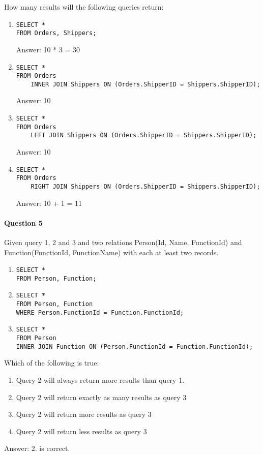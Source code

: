 \documentclass[10pt,a4paper]{report}
\begin{document}
How many results will the following queries return:
\begin{enumerate}
\item 
\begin{verbatim}
SELECT * 
FROM Orders, Shippers;
\end{verbatim}
Answer: 10 * 3 = 30 
\item 
\begin{verbatim}
SELECT * 
FROM Orders
    INNER JOIN Shippers ON (Orders.ShipperID = Shippers.ShipperID);
\end{verbatim}
Answer: 10 
\item
\begin{verbatim} 
SELECT * 
FROM Orders 
    LEFT JOIN Shippers ON (Orders.ShipperID = Shippers.ShipperID);
\end{verbatim}
Answer: 10
\item
\begin{verbatim} 
SELECT * 
FROM Orders 
    RIGHT JOIN Shippers ON (Orders.ShipperID = Shippers.ShipperID);
\end{verbatim}
Answer: 10 + 1 = 11 
\end{enumerate}
 
\paragraph{Question 5}
Given query 1, 2 and 3 and two relations Person(Id, Name, FunctionId) and Function(FunctionId, FunctionName) with each at least two records.
\begin{enumerate}
\item
\begin{verbatim} 
SELECT * 
FROM Person, Function;
\end{verbatim}
\item
\begin{verbatim} 
SELECT * 
FROM Person, Function 
WHERE Person.FunctionId = Function.FunctionId;
\end{verbatim}
\item
\begin{verbatim} 
SELECT * 
FROM Person 
INNER JOIN Function ON (Person.FunctionId = Function.FunctionId);
\end{verbatim}
\end{enumerate}
Which of the following is true:
\begin{enumerate}
\item Query 2 will always return more results than query 1.
\item Query 2 will return exactly as many results as query 3
\item Query 2 will return more results as query 3
\item Query 2 will return less results as query 3
\end{enumerate}
Answer: 2. is correct.
\end{document}
